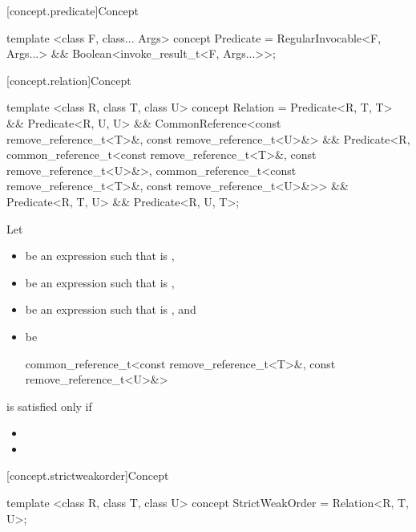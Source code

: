 [concept.predicate]{Concept }

%
\begin{itemdecl}
template <class F, class... Args>
concept Predicate = RegularInvocable<F, Args...> &&
  Boolean<invoke_result_t<F, Args...>>;
\end{itemdecl}

[concept.relation]{Concept }

%
\begin{itemdecl}
template <class R, class T, class U>
concept Relation = Predicate<R, T, T> && Predicate<R, U, U> &&
  CommonReference<const remove_reference_t<T>&, const remove_reference_t<U>&> &&
  Predicate<R,
    common_reference_t<const remove_reference_t<T>&, const remove_reference_t<U>&>,
    common_reference_t<const remove_reference_t<T>&, const remove_reference_t<U>&>> &&
  Predicate<R, T, U> && Predicate<R, U, T>;
\end{itemdecl}

\begin{itemdescr}
\pnum
Let
\begin{itemize}
\item {} be an expression such that  is ,
\item {} be an expression such that  is ,
\item {} be an expression such that  is ,
  and
\item {} be
  \begin{codeblock}
  common_reference_t<const remove_reference_t<T>&,
  const remove_reference_t<U>&>
  \end{codeblock}
\end{itemize}
 is satisfied only if

\begin{itemize}
\item {}
\item {}
\end{itemize}
\end{itemdescr}

[concept.strictweakorder]{Concept }

%
\begin{itemdecl}
template <class R, class T, class U>
concept StrictWeakOrder = Relation<R, T, U>;
\end{itemdecl}

